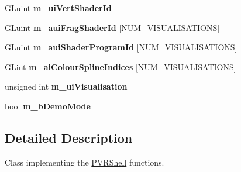 \begin{DoxyCompactItemize}
\item 
\hypertarget{class_o_g_l_e_s2_procedural_textures_ae3292e268dbe525538fbe293bf225bbf}{G\+Luint {\bfseries m\+\_\+ui\+Vert\+Shader\+Id}}\label{class_o_g_l_e_s2_procedural_textures_ae3292e268dbe525538fbe293bf225bbf}

\item 
\hypertarget{class_o_g_l_e_s2_procedural_textures_a8fb4735fb11d2e1c553ab46dd02deb81}{G\+Luint {\bfseries m\+\_\+aui\+Frag\+Shader\+Id} \mbox{[}N\+U\+M\+\_\+\+V\+I\+S\+U\+A\+L\+I\+S\+A\+T\+I\+O\+N\+S\mbox{]}}\label{class_o_g_l_e_s2_procedural_textures_a8fb4735fb11d2e1c553ab46dd02deb81}

\item 
\hypertarget{class_o_g_l_e_s2_procedural_textures_abcfda69b5b4b262afe393f3aefe7641c}{G\+Luint {\bfseries m\+\_\+aui\+Shader\+Program\+Id} \mbox{[}N\+U\+M\+\_\+\+V\+I\+S\+U\+A\+L\+I\+S\+A\+T\+I\+O\+N\+S\mbox{]}}\label{class_o_g_l_e_s2_procedural_textures_abcfda69b5b4b262afe393f3aefe7641c}

\item 
\hypertarget{class_o_g_l_e_s2_procedural_textures_ac680d62c6efc931cc010eaae81620e3b}{G\+Lint {\bfseries m\+\_\+ai\+Colour\+Spline\+Indices} \mbox{[}N\+U\+M\+\_\+\+V\+I\+S\+U\+A\+L\+I\+S\+A\+T\+I\+O\+N\+S\mbox{]}}\label{class_o_g_l_e_s2_procedural_textures_ac680d62c6efc931cc010eaae81620e3b}

\item 
\hypertarget{class_o_g_l_e_s2_procedural_textures_ade88cd3f785e831deeec20c435f4f482}{unsigned int {\bfseries m\+\_\+ui\+Visualisation}}\label{class_o_g_l_e_s2_procedural_textures_ade88cd3f785e831deeec20c435f4f482}

\item 
\hypertarget{class_o_g_l_e_s2_procedural_textures_ab9bbf26569bf187f4cc92e09d6650c98}{bool {\bfseries m\+\_\+b\+Demo\+Mode}}\label{class_o_g_l_e_s2_procedural_textures_ab9bbf26569bf187f4cc92e09d6650c98}

\end{DoxyCompactItemize}


\subsection{Detailed Description}


 Class implementing the \hyperlink{class_p_v_r_shell}{P\+V\+R\+Shell} functions. 

